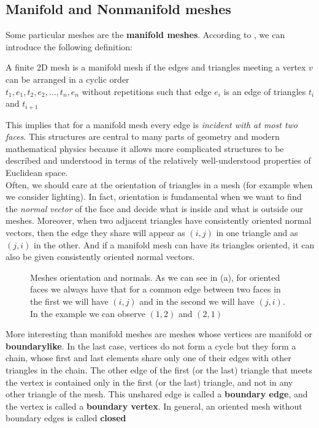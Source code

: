 \subsection{Manifold and Nonmanifold meshes}
Some particular meshes are the \textbf{manifold meshes}. According to \cite{Hughes}, we can introduce the following definition:

\begin{definition}
A finite 2D mesh is a manifold mesh if the edges and triangles meeting a vertex $v$ can be arranged in a cyclic order\\ $t_{1}, e_{1}, t_{2}, e_{2}, \dots, t_{n}, e_{n}$ without repetitions such that edge $e_{i}$ is an edge of triangles $t_{i}$ and $t_{i+1}$
\end{definition}

This implies that for a manifold mesh every edge is \textit{incident with at most two faces}. This structures are central to many parts of geometry and modern mathematical physics because it allows more complicated structures to be described and understood in terms of the relatively well-understood properties of Euclidean space.\\

Often, we should care at the orientation of triangles in a mesh (for example when we consider lighting). In fact, orientation is fundamental when we want to find the \textit{normal vector} of the face and decide what is inside and what is outside our meshes. Moreover, when two adjacent triangles have consistently oriented normal vectors, then the edge they share will appear as $(i, j)$ in one triangle and as $(j, i)$ in the other. And if a manifold mesh can have its triangles oriented, it can also be given consistently oriented normal vectors.\\

\begin{figure}[htb] %
   \centering
   
   \caption[Meshes orientation and normals]{Meshes orientation and normals. As we can see in (a), for oriented faces we always have that for a common edge between two faces in the first we will have $(i, j)$ and in the second we will have $(j , i)$. In the example we can observe $(1, 2)$ and $(2, 1)$}
   \label{fig:normals}
\end{figure}

More interesting than manifold meshes are meshes whose vertices are manifold or \textbf{boundarylike}. In the last case, vertices do not form a cycle but they form a chain, whose first and last elements share only one of their edges with other triangles in the chain. The other edge of the first (or the last) triangle that meets the vertex is contained only in the first (or the last) triangle, and not in any other triangle of the mesh. This unshared edge is called a \textbf{boundary edge}, and the vertex is called a \textbf{boundary vertex}. In general, an oriented mesh without boundary edges is called \textbf{closed}

